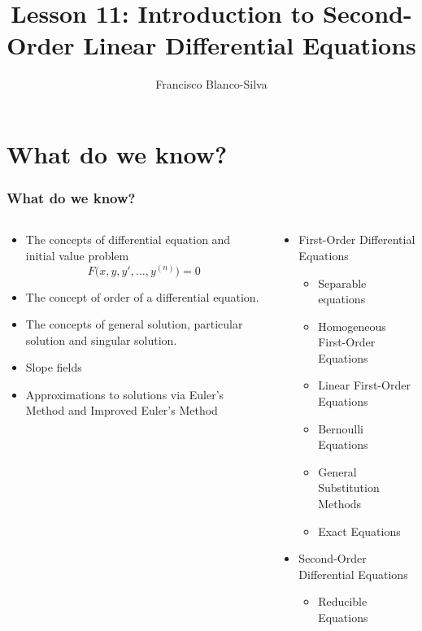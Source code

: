 \documentclass[9pt,xcolor=x11names,compress]{beamer}
\author[Francisco Blanco-Silva]{Francisco Blanco-Silva}
\institute[USC]{University of South Carolina}
\date{
\pgfdeclarelindenmayersystem{Hilbert curve}{
  \rule{L -> +RF-LFL-FR+}
  \rule{R -> -LF+RFR+FL-}}
	\begin{tikzpicture} 
    \shadedraw [bottom color=white, top color=DeepSkyBlue4, draw=black]
    [l-system={Hilbert curve, axiom=L, order=5, step=3pt, angle=90}]
    lindenmayer system; 
	\end{tikzpicture}
}
\title{Lesson 11: Introduction to Second-Order Linear Differential Equations}
\begin{document}
\frame{\titlepage}

\section{What do we know?}
\begin{frame}\frametitle{What do we know?}
\begin{columns}[T]
\begin{column}{0.5\linewidth}
\begin{itemize}
\item The concepts of \alert{differential equation} and \alert{initial value problem}
\begin{equation*}
F\big(x,y,y',\dotsc,y^{(n)}\big)=0
\end{equation*}
\item The concept of \alert{order} of a differential equation.
\item The concepts of \alert{general solution}, \alert{particular solution} and \alert{singular solution}.
\item \alert{Slope fields}
\item Approximations to solutions via \alert{Euler's Method} and \alert{Improved Euler's Method}
\end{itemize} 
\end{column}
\begin{column}{0.5\linewidth}
\begin{itemize}
\item First-Order Differential Equations
\begin{itemize}
\item Separable equations 
\item Homogeneous First-Order Equations 
\item Linear First-Order Equations 
\item Bernoulli Equations 
\item General Substitution Methods
\item Exact Equations 
\end{itemize}
\item Second-Order Differential Equations
\begin{itemize}
	\item Reducible Equations
\end{itemize}
\end{itemize}
\end{column}
\end{columns}
\end{frame}
\end{document}
